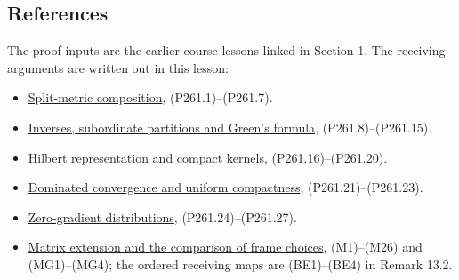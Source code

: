 \documentclass[
  11pt,
]{article}
\providecommand{\tightlist}{%
  \setlength{\itemsep}{0pt}\setlength{\parskip}{0pt}}
\begin{document}
\subsection{References}\label{references}

The proof inputs are the earlier course lessons linked in Section 1. The
receiving arguments are written out in this lesson:

\begin{itemize}
\tightlist
\item
  \hyperref[AN03-BOTT-P261-1]{Split-metric composition},
  (P261.1)--(P261.7).
\item
  \hyperref[AN03-BOTT-P261-2]{Inverses, subordinate partitions and
  Green's formula}, (P261.8)--(P261.15).
\item
  \hyperref[AN03-BOTT-P261-3]{Hilbert representation and compact
  kernels}, (P261.16)--(P261.20).
\item
  \hyperref[AN03-BOTT-P261-4]{Dominated convergence and uniform
  compactness}, (P261.21)--(P261.23).
\item
  \hyperref[AN03-BOTT-P261-5]{Zero-gradient distributions},
  (P261.24)--(P261.27).
\item
  \href{matrix-extension.pdf}{Matrix extension and the comparison of
  frame choices}, (M1)--(M26) and (MG1)--(MG4); the ordered receiving
  maps are (BE1)--(BE4) in Remark 13.2.
\end{itemize}
\end{document}
